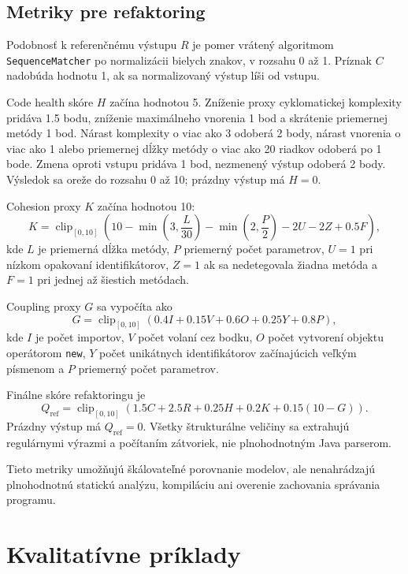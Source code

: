 \documentclass[11pt,a4paper]{article}
\begin{document}
\subsection{Metriky pre refaktoring}

Podobnosť k referenčnému výstupu $R$ je pomer vrátený algoritmom
\texttt{SequenceMatcher} po normalizácii bielych znakov, v rozsahu 0 až 1.
Príznak $C$ nadobúda hodnotu 1, ak sa normalizovaný výstup líši od vstupu.

Code health skóre $H$ začína hodnotou 5. Zníženie proxy cyklomatickej
komplexity pridáva 1.5 bodu, zníženie maximálneho vnorenia 1 bod a skrátenie
priemernej metódy 1 bod. Nárast komplexity o viac ako 3 odoberá 2 body,
nárast vnorenia o viac ako 1 alebo priemernej dĺžky metódy o viac ako 20
riadkov odoberá po 1 bode. Zmena oproti vstupu pridáva 1 bod, nezmenený
výstup odoberá 2 body. Výsledok sa oreže do rozsahu 0 až 10; prázdny výstup
má $H=0$.

Cohesion proxy $K$ začína hodnotou 10:
\begin{equation}
K=\operatorname{clip}_{[0,10]}\left(
10-\min\left(3,\frac{L}{30}\right)
-\min\left(2,\frac{P}{2}\right)-2U-2Z+0.5F
\right),
\end{equation}
kde $L$ je priemerná dĺžka metódy, $P$ priemerný počet parametrov,
$U=1$ pri nízkom opakovaní identifikátorov, $Z=1$ ak sa nedetegovala žiadna
metóda a $F=1$ pri jednej až šiestich metódach.

Coupling proxy $G$ sa vypočíta ako
\begin{equation}
G=\operatorname{clip}_{[0,10]}
\left(0.4I+0.15V+0.6O+0.25Y+0.8P\right),
\end{equation}
kde $I$ je počet importov, $V$ počet volaní cez bodku, $O$ počet vytvorení
objektu operátorom \texttt{new}, $Y$ počet unikátnych identifikátorov
začínajúcich veľkým písmenom a $P$ priemerný počet parametrov.

Finálne skóre refaktoringu je
\begin{equation}
Q_{\mathrm{ref}}=\operatorname{clip}_{[0,10]}
\left(1.5C+2.5R+0.25H+0.2K+0.15(10-G)\right).
\end{equation}
Prázdny výstup má $Q_{\mathrm{ref}}=0$. Všetky štrukturálne veličiny sa
extrahujú regulárnymi výrazmi a počítaním zátvoriek, nie plnohodnotným Java
parserom.

Tieto metriky umožňujú škálovateľné porovnanie modelov, ale nenahrádzajú plnohodnotnú statickú analýzu, kompiláciu ani overenie zachovania správania programu.

\section{Kvalitatívne príklady}
\end{document}
